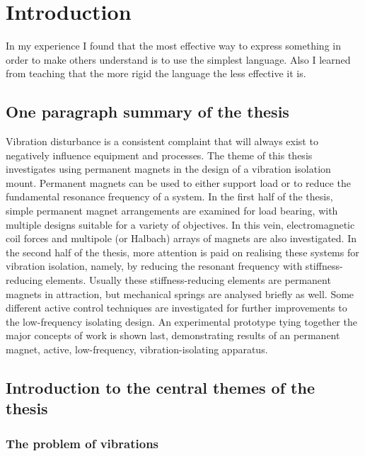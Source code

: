 
\chapter{Introduction}

\epigraph{In my experience I found that the most effective way to express
something in order to make others understand is to use the simplest language.
Also I learned from teaching that the more rigid the language the less
effective it is.}{\textcite{mahathera1990}}

\section{One paragraph summary of the thesis}

Vibration disturbance is a consistent complaint that will always exist to
negatively influence equipment and processes. The theme of this thesis
investigates using permanent magnets in the design of a vibration isolation
mount. Permanent magnets can be used to either support load or to reduce the
fundamental resonance frequency of a system. In the first half of the thesis,
simple permanent magnet arrangements are examined for load bearing, with
multiple designs suitable for a variety of objectives. In this vein,
electromagnetic coil forces and multipole (or Halbach) arrays of magnets are
also investigated. In the second half of the thesis, more attention is paid on
realising these systems for vibration isolation, namely, by reducing the
resonant frequency with stiffness-reducing elements. Usually these
stiffness-reducing elements are permanent magnets in attraction, but
mechanical springs are analysed briefly as well. Some different active control
techniques are investigated for further improvements to the low-frequency
isolating design. An experimental prototype tying together the major concepts
of work is shown last, demonstrating results of an permanent magnet, active,
low-frequency, vibration-isolating apparatus.

\section{Introduction to the central themes of the thesis}

\subsection{The problem of vibrations}

